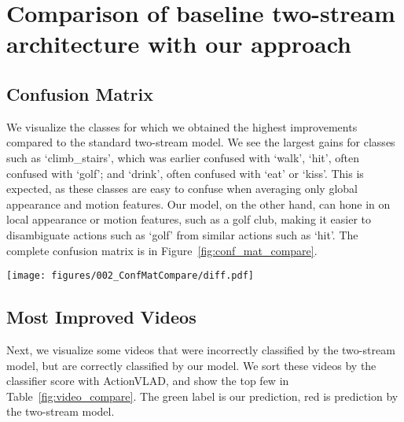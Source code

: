 \documentclass[10pt,twocolumn,letterpaper]{article}
\newcommand{\methodTag}[0]{ActionVLAD}
\begin{document}
\section{Comparison of baseline two-stream architecture with our approach}

\subsection{Confusion Matrix}
We visualize the classes for which we obtained the highest
improvements compared to the standard two-stream model.
We see the largest gains for classes such as `climb\_stairs',
which was earlier confused with `walk',
`hit', often confused with `golf'; and `drink', 
often confused with `eat' or `kiss'. This is expected,
as these classes are easy to confuse 
when averaging only global appearance and motion features.
Our model, on the other hand, can hone in on local appearance or motion features, such as a golf
club, making it easier to disambiguate actions such as `golf' from similar actions such
as `hit'.
The complete confusion matrix is in Figure~\ref{fig:conf_mat_compare}.

\begin{figure*}
    \centering
    \texttt{[image: figures/002\_ConfMatCompare/diff.pdf]}
    \caption{Difference of confusion matrices for classification on HMDB51 split 1 test set
    using our \methodTag{} representation versus the two-stream model.
    Red denotes positive changes and blue negative,
    so for improvements we would expect reds on the diagonal
    and blues off-diagonal.
    Compared to two-stream results, we see largest 
    improvement for classes such as `hit', which was earlier confused with `golf';
    or `climb\_stairs' which was confused with `walk'.}\label{fig:conf_mat_compare}
\end{figure*}


\subsection{Most Improved Videos}
Next, we visualize some videos that were incorrectly classified by the two-stream model, but 
are correctly classified by our model. We sort these videos by the classifier score with \methodTag{}, and show the top few in Table~\ref{fig:video_compare}.
The green label is our prediction, red is prediction by the two-stream model.
\end{document}

